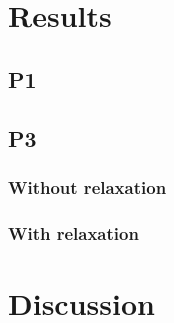 \chapter{Results}

\section{P1}

\section{P3}

\subsection{Without relaxation}

\subsection{With relaxation}

\chapter{Discussion}
